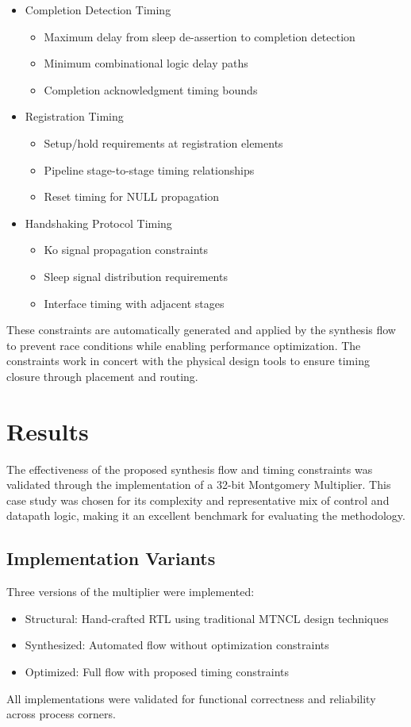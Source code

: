 \documentclass[conference]{IEEEtran}
\begin{document}
\begin{itemize}
\item Completion Detection Timing
  \begin{itemize}
  \item Maximum delay from sleep de-assertion to completion detection
  \item Minimum combinational logic delay paths
  \item Completion acknowledgment timing bounds
  \end{itemize}
\item Registration Timing
  \begin{itemize}
  \item Setup/hold requirements at registration elements
  \item Pipeline stage-to-stage timing relationships
  \item Reset timing for NULL propagation
  \end{itemize}
\item Handshaking Protocol Timing
  \begin{itemize}
  \item Ko signal propagation constraints
  \item Sleep signal distribution requirements
  \item Interface timing with adjacent stages
  \end{itemize}
\end{itemize}

These constraints are automatically generated and applied by the synthesis flow to prevent race conditions while enabling performance optimization. The constraints work in concert with the physical design tools to ensure timing closure through placement and routing.

\section{Results}
The effectiveness of the proposed synthesis flow and timing constraints was validated through the implementation of a 32-bit Montgomery Multiplier. This case study was chosen for its complexity and representative mix of control and datapath logic, making it an excellent benchmark for evaluating the methodology.

\subsection{Implementation Variants}
Three versions of the multiplier were implemented:
\begin{itemize}
\item Structural: Hand-crafted RTL using traditional MTNCL design techniques
\item Synthesized: Automated flow without optimization constraints
\item Optimized: Full flow with proposed timing constraints
\end{itemize}
All implementations were validated for functional correctness and reliability across process corners.
\end{document}
